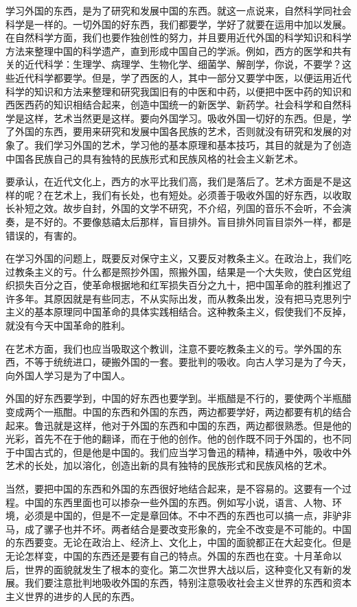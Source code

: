 学习外国的东西，是为了研究和发展中国的东西。就这一点说来，自然科学同社会科学是一样的。一切外国的好东西，我们都要学，学好了就要在运用中加以发展。在自然科学方面，我们也要作独创性的努力，并且要用近代外国的科学知识和科学方法来整理中国的科学遗产，直到形成中国自己的学派。例如，西方的医学和共有关的近代科学：生理学、病理学、生物化学、细菌学、解剖学，你说，不要学？这些近代科学都要学。但是，学了西医的人，其中一部分又要学中医，以便运用近代科学的知识和方法来整理和研究我国旧有的中医和中药，以便把中医中药的知识和西医西药的知识相结合起来，创造中国统一的新医学、新药学。社会科学和自然科学是这样，艺术当然更是这样。要向外国学习。吸收外国一切好的东西。但是，学了外国的东西，要用来研究和发展中国各民族的艺术，否则就没有研究和发展的对象了。我们学习外国的艺术，学习他的基本原理和基本技巧，其目的就是为了创造中国各民族自己的具有独特的民族形式和民族风格的社会主义新艺术。

要承认，在近代文化上，西方的水平比我们高，我们是落后了。艺术方面是不是这样的呢？在艺术上，我们有长处，也有短处。必须善于吸收外国的好东西，以收取长补短之效。故步自封，外国的文学不研究，不介绍，列国的音乐不会听，不会演奏，是不好的。不要像慈禧太后那样，盲目排外。盲目排外同盲目崇外一样，都是错误的，有害的。

在学习外国的问题上，既要反对保守主义，又要反对教条主义。在政治上，我们吃过教条主义的亏。什么都是照抄外国，照搬外国，结果是一个大失败，使白区党组织损失百分之百，使革命根据地和红军损失百分之九十，把中国革命的胜利推迟了许多年。其原因就是有些同志，不从实际出发，而从教条出发，没有把马克思列宁主义的基本原理同中国革命的具体实践相结合。这种教条主义，假使我们不反掉，就没有今天中国革命的胜利。

在艺术方面，我们也应当吸取这个教训，注意不要吃教条主义的亏。学外国的东西，不等于统统进口，硬搬外国的一套。要批判的吸收。向古人学习是为了今天，向外国人学习是为了中国人。

外国的好东西要学到，中国的好东西也要学到。半瓶醋是不行的，要使两个半瓶醋变成两个一瓶酣。中国的东西和外国的东西，两边都要学好，两边都要有机的结合起来。鲁迅就是这样，他对于外国的东西和中国的东西，两边都很熟悉。但是他的光彩，首先不在于他的翻译，而在于他的创作。他的创作既不同于外国的，也不同于中国古式的，但是他是中国的。我们应当学习鲁迅的精神，精通中外，吸收中外艺术的长处，加以溶化，创造出新的具有独特的民族形式和民族风格的艺术。

当然，要把中国的东西和外国的东西很好地结合起来，是不容易的。这要有一个过程。中国的东西里面也可以掺杂一些外国的东西。例如写小说，语言、人物、环境，必须是中国的，但是不一定是章回体。不中不西的东西也可以搞一点，非驴非马，成了骡子也并不坏。两者结合是要改变形象的，完全不改变是不可能的。中国的东西要变。无论在政治上、经济上、文化上，中国的面貌都正在大起变化。但是无论怎样变，中国的东西还是要有自己的特点。外国的东西也在变。十月革命以后，世界的面貌就发生了根本的变化。第二次世界大战以后，这种变化又有新的发展。我们要注意批判地吸收外国的东西，特别注意吸收社会主义世界的东西和资本主义世界的进步的人民的东西。

